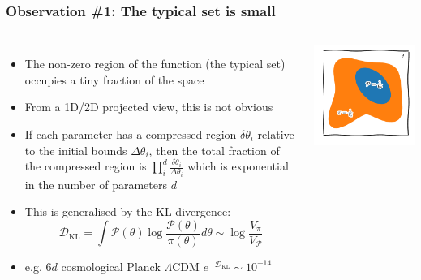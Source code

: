 \documentclass[aspectratio=169]{beamer}
\begin{document}
\begin{frame}
    \frametitle{Observation \#1: The typical set is small}

    \begin{columns}
    \begin{itemize}
        \item The non-zero region of the function (the typical set) occupies a tiny fraction of the space
        \item From a 1D/2D projected view, this is not obvious
        \item If each parameter has a compressed region $\delta\theta_i$ relative to the initial bounds $\Delta\theta_i$, then the total fraction of the compressed region is
            $\prod_i^d \frac{\delta \theta_i}{\Delta \theta_i}$
        which is exponential in the number of parameters $d$
    \item This is generalised by the KL divergence:
\[\mathcal{D}_\mathrm{KL} = \int \mathcal{P}(\theta) \log\frac{\mathcal{P}(\theta)}{\pi(\theta)} d\theta \sim \log \frac{V_\pi}{V_\mathcal{P}}\]
    \item e.g. $6d$ cosmological Planck $\Lambda$CDM $e^{-\mathcal{D}_\mathrm{KL}}\sim 10^{-14}$
    \end{itemize}
        
        \includegraphics[width=\textwidth]{figures/volumes.pdf}
    \end{columns}

\end{frame}
\end{document}

